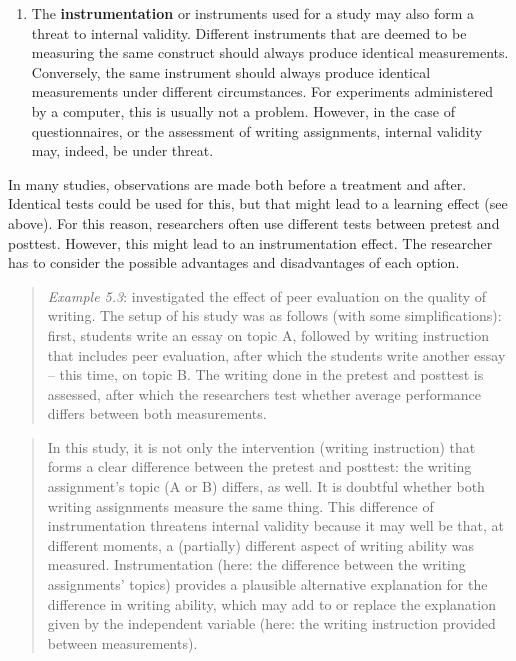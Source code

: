 \documentclass[
]{book}
\providecommand{\tightlist}{%
  \setlength{\itemsep}{0pt}\setlength{\parskip}{0pt}}
\begin{document}
\begin{enumerate}
\def\labelenumi{\arabic{enumi}.}
\setcounter{enumi}{2}
\tightlist
\item
  The \textbf{instrumentation} or instruments used for a study may also form a threat to internal validity. Different instruments that are deemed to be measuring the same construct should always produce identical measurements. Conversely, the same instrument should always produce identical measurements under different circumstances. For experiments administered by a computer, this is usually not a problem. However, in the case of questionnaires, or the assessment of writing assignments, internal validity may, indeed, be under threat.
\end{enumerate}

In many studies, observations are made both before a treatment and after. Identical tests could be used for this, but that might lead to a learning effect (see above). For this reason, researchers often use different tests between pretest and posttest. However, this might lead to an instrumentation effect. The researcher has to consider the possible advantages and disadvantages of each option.

\begin{quote}
\emph{Example 5.3}: \citet{Rijl86} investigated the effect of peer evaluation on the quality of writing. The setup of his study was as follows (with some simplifications): first, students write an essay on topic A, followed by writing instruction that includes peer evaluation, after which the students write another essay -- this time, on topic B. The writing done in the pretest and posttest is assessed, after which the researchers test whether average performance differs between both measurements.
\end{quote}

\begin{quote}
In this study, it is not only the intervention (writing instruction) that forms a clear difference between the pretest and posttest: the writing assignment's topic (A or B) differs, as well. It is doubtful whether both writing assignments measure the same thing. This difference of instrumentation threatens internal validity because it may well be that, at different moments, a (partially) different aspect of writing ability was measured. Instrumentation (here: the difference between the writing assignments' topics) provides a plausible alternative explanation for the difference in writing ability, which may add to or replace the explanation given by the independent variable (here: the writing instruction provided between measurements).
\end{quote}
\end{document}
